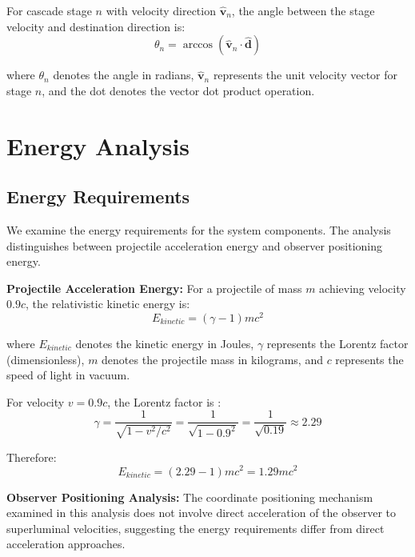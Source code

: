 \documentclass[12pt,a4paper]{article}
\begin{document}
For cascade stage $n$ with velocity direction $\hat{\mathbf{v}}_n$, the angle between the stage velocity and destination direction is:
\begin{equation}
\theta_n = \arccos(\hat{\mathbf{v}}_n \cdot \hat{\mathbf{d}})
\end{equation}

where $\theta_n$ denotes the angle in radians, $\hat{\mathbf{v}}_n$ represents the unit velocity vector for stage $n$, and the dot denotes the vector dot product operation.

\section{Energy Analysis}

\subsection{Energy Requirements}

We examine the energy requirements for the system components. The analysis distinguishes between projectile acceleration energy and observer positioning energy.

\textbf{Projectile Acceleration Energy:}
For a projectile of mass $m$ achieving velocity $0.9c$, the relativistic kinetic energy is:
\begin{equation}
E_{kinetic} = (\gamma - 1)mc^2
\end{equation}

where $E_{kinetic}$ denotes the kinetic energy in Joules, $\gamma$ represents the Lorentz factor (dimensionless), $m$ denotes the projectile mass in kilograms, and $c$ represents the speed of light in vacuum.

For velocity $v = 0.9c$, the Lorentz factor is \cite{landau1975}:
\begin{equation}
\gamma = \frac{1}{\sqrt{1-v^2/c^2}} = \frac{1}{\sqrt{1-0.9^2}} = \frac{1}{\sqrt{0.19}} \approx 2.29
\end{equation}

Therefore:
\begin{equation}
E_{kinetic} = (2.29 - 1)mc^2 = 1.29mc^2
\end{equation}

\textbf{Observer Positioning Analysis:}
The coordinate positioning mechanism examined in this analysis does not involve direct acceleration of the observer to superluminal velocities, suggesting the energy requirements differ from direct acceleration approaches.
\end{document}
